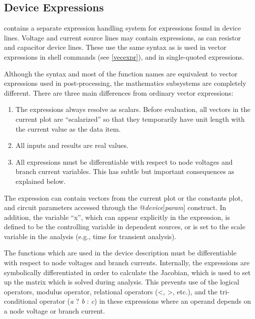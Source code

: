 \subsection{Device Expressions}
\label{devexpr}


{\WRspice} contains a separate expression handling system for
expressions found in device lines.  Voltage and current source lines
may contain expressions, as can resistor and capacitor device lines. 
These use the same syntax as is used in vector expressions in
{\WRspice} shell commands (see \ref{vecexpr}), and in single-quoted
expressions.

Although the syntax and most of the function names are equivalent to
vector expressions used in post-processing, the mathematics subsystems
are completely different.  There are three main differences from
ordinary vector expressions:

\begin{enumerate}
\item{The expressions always resolve as scalars.  Before evaluation,
all vectors in the current plot are ``scalarized'' so that they temporarily
have unit length with the current value as the data item.}

\item{All inputs and results are real values.}

\item{All expressions must be differentiable with respect to node
voltages and branch current variables.  This has subtle but important
consequences as explained below.}
\end{enumerate}

The expression can contain vectors from the current plot
or the {\vt constants} plot, and circuit parameters accessed through
the {\vt @{\it device\/}[{\it param\/}]} construct.  In addition, the
variable ``{\vt x}'', which can appear explicitly in the expression,
is defined to be the controlling variable in dependent sources, or is
set to the scale variable in the analysis (e.g., {\et time} for
transient analysis).

The functions which are used in the device description must be
differentiable with respect to node voltages and branch currents. 
Internally, the expressions are symbolically differentiated in order
to calculate the Jacobian, which is used to set up the matrix which is
solved during analysis.  This prevents use of the logical operators,
modulus operator, relational operators ({\vt <}, {\vt >}, etc.), and
the tri-conditional operator ({\it a} {\vt ?} {\it b} {\vt :} {\it
c\/}) in these expressions where an operand depends on a node voltage
or branch current.

